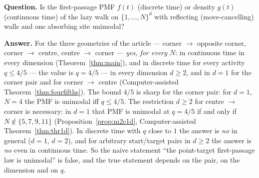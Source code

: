 \documentclass[11pt,a4paper]{article}
\theoremstyle{definition}
\begin{document}
\textbf{Question.} Is the first-passage PMF $f(t)$ (discrete time) or density $g(t)$ (continuous time) of the lazy walk on $\{1,\dots,N\}^d$ with reflecting (move-cancelling) walls and one absorbing site unimodal?

\textbf{Answer.} For the three geometries of the article --- corner $\to$ opposite corner, corner $\to$ centre, centre $\to$ corner --- \emph{yes, for every $N$}: in continuous time in every dimension (Theorem~\ref{thm:main}), and in discrete time for every activity $q\le4/5$ --- the value is $q=4/5$ --- in every dimension $d\ge2$, and in $d=1$ for the corner pair and for corner $\to$ centre (Computer-assisted Theorem~\ref{thm:fourfifths}). The bound $4/5$ is sharp for the corner pair: for $d=1$, $N=4$ the PMF is unimodal iff $q\le4/5$. The restriction $d\ge2$ for centre $\to$ corner is necessary: in $d=1$ that PMF is unimodal at $q=4/5$ if and only if $N\notin\{5,7,9,11\}$ (Proposition~\ref{prop:m2c1d}, Computer-assisted Theorem~\ref{thm:thr1d}). In discrete time with $q$ close to $1$ the answer is \emph{no} in general ($d=1$, $d=2$), and for arbitrary start/target pairs in $d\ge2$ the answer is \emph{no} even in continuous time. So the naive statement ``the point-target first-passage law is unimodal'' is false, and the true statement depends on the pair, on the dimension and on $q$.
\end{document}

